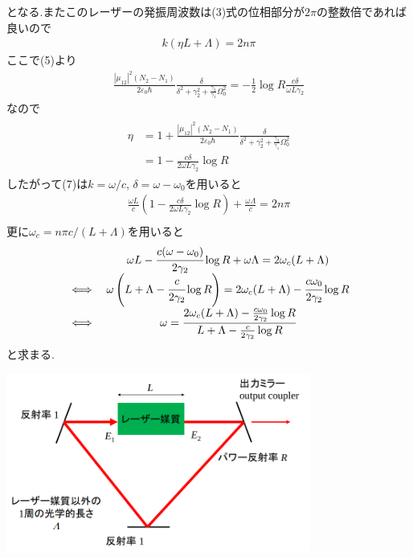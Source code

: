 \documentclass[uplatex,a4j,11pt,dvipdfmx]{jsarticle}
\makeatletter
\def\fgcaption{\def\@captype{figure}\caption}
\makeatother
\begin{document}
となる.またこのレーザーの発振周波数は(3)式の位相部分が$2\pi$の整数倍であれば良いので
\begin{align}
  k(\eta L+\Lambda)=2n\pi
\end{align}
ここで(5)より
\begin{align}
  \frac{|\mu_{12}|^2(N_2-N_1)}{2\varepsilon_0\hbar}\frac{\delta}{\delta^2+\gamma_2^2+\frac{\gamma_2}{\gamma_1}\Omega_0^2}=-\frac{1}{2}\log R\frac{c\delta}{\omega L\gamma_2}
\end{align}
なので
\begin{align}
  \begin{split}
    \eta&=1+\frac{|\mu_{12}|^2(N_2-N_1)}{2\varepsilon_0\hbar}\frac{\delta}{\delta^2+\gamma_2^2+\frac{\gamma_2}{\gamma_1}\Omega_0^2}\\
    &=1-\frac{c\delta}{2\omega L\gamma_2}\log R
  \end{split}
\end{align}
したがって(7)は$k=\omega/c$, $\delta=\omega-\omega_0$を用いると
\begin{align}
  \frac{\omega L}{c}\left(1-\frac{c\delta}{2\omega L\gamma_2}\log R\right)+\frac{\omega\Lambda}{c}=2n\pi\\    
\end{align}
更に$\omega_c=n\pi c/(L+\Lambda)$を用いると
\begin{align}
  \begin{array}{cc}
    &\omega L-\cfrac{c(\omega-\omega_0)}{2\gamma_2}\log R+\omega\Lambda=2\omega_c(L+\Lambda)\\
    \iff&\omega\left(L+\Lambda-\cfrac{c}{2\gamma_2}\log R\right)=2\omega_c(L+\Lambda)-\cfrac{c\omega_0}{2\gamma_2}\log R\\
    \iff&\omega=\cfrac{2\omega_c(L+\Lambda)-\frac{c\omega_0}{2\gamma_2}\log R}{L+\Lambda-\frac{c}{2\gamma_2}\log R}
  \end{array}
\end{align}
と求まる.
\begin{center}
  \includegraphics[width=10cm]{ring.png}
  \fgcaption{リング型共振器(授業スライドより引用)}
\end{center}
\end{document}
